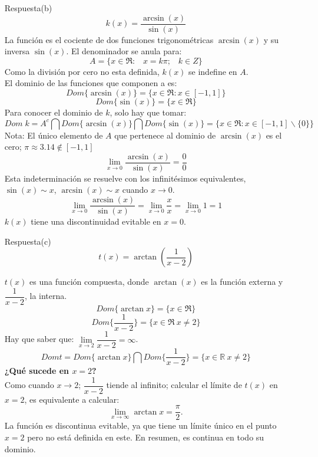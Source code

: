 \documentclass[10pt,twoside]{SelfArx} %
\begin{document}
\begin{enumerate}
\begin{enumerate}
	
	\item[Respuesta(b)]
	\[ k(x)=\dfrac{\arcsin(x)}{\sin(x)} \]
	La función es el cociente de dos funciones trigonométricas $ \arcsin(x) $ y  su inversa $ \sin(x) $. El denominador se anula para:
	\[ A=\{x\in\Re:\;\;\; x=k\pi;\;\;\; k\in Z\} \]
	Como la división por cero no esta definida, $ k(x) $ se indefine en $ A $.\\
	El dominio de las funciones que componen a es:
	\[ Dom\{\arcsin(x)\}=\{x\in\Re: x\in[-1,1] \} \]
	\[ Dom\{\sin(x)\}=\{x\in\Re \} \]
	Para conocer el dominio de $ k $, solo hay que tomar:
	\[ Dom\;k=A^{c}\bigcap Dom\{\arcsin(x)\}\bigcap Dom\{\sin(x)\}=\{x\in\Re: x\in[-1,1] \backslash \{0\} \} \]
	Nota: El \'unico elemento de $ A $ que pertenece al dominio de $ \arcsin(x) $ es el cero;
 $ \pi\approx 3.14 \notin [-1,1] $
 \[ \lim\limits_{x\rightarrow0}\dfrac{\arcsin(x)}{\sin(x)}=\dfrac{0}{0} \]
 Esta indeterminaci\'on se resuelve con los infinit\'esimos equivalentes, $ \sin(x)\sim x $, $ \arcsin(x)\sim x $ cuando $ x\rightarrow0 $.
	 \[ \lim\limits_{x\rightarrow0}\dfrac{\arcsin(x)}{\sin(x)}=\lim\limits_{x\rightarrow0}\frac{x}{x}=\lim\limits_{x\rightarrow0}1=1 \]
	 $ k(x) $ tiene una discontinuidad evitable en $ x=0 $.\\

	\item[Respuesta(c)]
	\[ t(x)=\arctan(\dfrac{1}{x-2}) \]
	
	$ t(x) $ es una función compuesta, donde $ \arctan(x) $ es la función externa y $ \dfrac{1}{x-2} $, la interna.
	\[ Dom\{\arctan x\} =\{x\in\Re\}\]
	\[ Dom\{\dfrac{1}{x-2}\}=\{ x\in\Re\:x\neq2 \}\] 
	Hay que saber que: $ \lim\limits_{x\rightarrow2}\dfrac{1}{x-2}=\infty $.
	\[ Dom t= Dom\{\arctan x\}\bigcap Dom\{\dfrac{1}{x-2}\}=\{ x\in\mathbb{R}\:x\neq2 \} \]
\textbf{	¿Qué sucede en $ x=2 $?}\\
	Como cuando $ x\rightarrow2 $; $ \dfrac{1}{x-2} $ tiende al infinito; calcular el l\'imite de $ t(x) $ en $ x=2 $, es equivalente a calcular:
	\[ \lim\limits_{x\rightarrow\infty}\arctan x =\dfrac{\pi}{2}. \]
	La función es discontinua evitable, ya que tiene un límite  único en el punto $ x=2 $ pero no está definida en este. En resumen, es continua en todo su dominio.
	
	
\end{enumerate}	
\end{enumerate}
\end{document}
